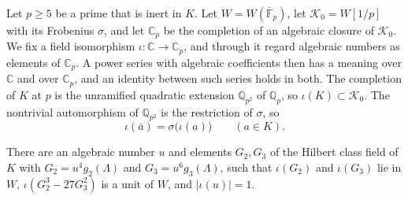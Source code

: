 Let $p\ge5$ be a prime that is inert in $K$. Let $W=W(\overline{\mathbb F}_p)$, let $\mathcal K_0=W[1/p]$ with its Frobenius $\sigma$, and let $\mathbb C_p$ be the completion of an algebraic closure of $\mathcal K_0$. We fix a field isomorphism $\iota\colon\mathbb C\to\mathbb C_p$, and through it regard algebraic numbers as elements of $\mathbb C_p$. A power series with algebraic coefficients then has a meaning over $\mathbb C$ and over $\mathbb C_p$, and an identity between such series holds in both. The completion of $K$ at $p$ is the unramified quadratic extension $\mathbb Q_{p^2}$ of $\mathbb Q_p$, so $\iota(K)\subset\mathcal K_0$. The nontrivial automorphism of $\mathbb Q_{p^2}$ is the restriction of $\sigma$, so
\begin{equation}\label{conjfrob}
\iota(\bar a)=\sigma\big(\iota(a)\big)\qquad(a\in K).
\end{equation}

\begin{proposition}\label{goodmodel}
There are an algebraic number $u$ and elements $G_2,G_3$ of the Hilbert class field of $K$ with $G_2=u^4g_2(\Lambda)$ and $G_3=u^6g_3(\Lambda)$, such that $\iota(G_2)$ and $\iota(G_3)$ lie in $W$, $\iota(G_2^3-27G_3^2)$ is a unit of $W$, and $\lvert\iota(u)\rvert=1$.
\end{proposition}

